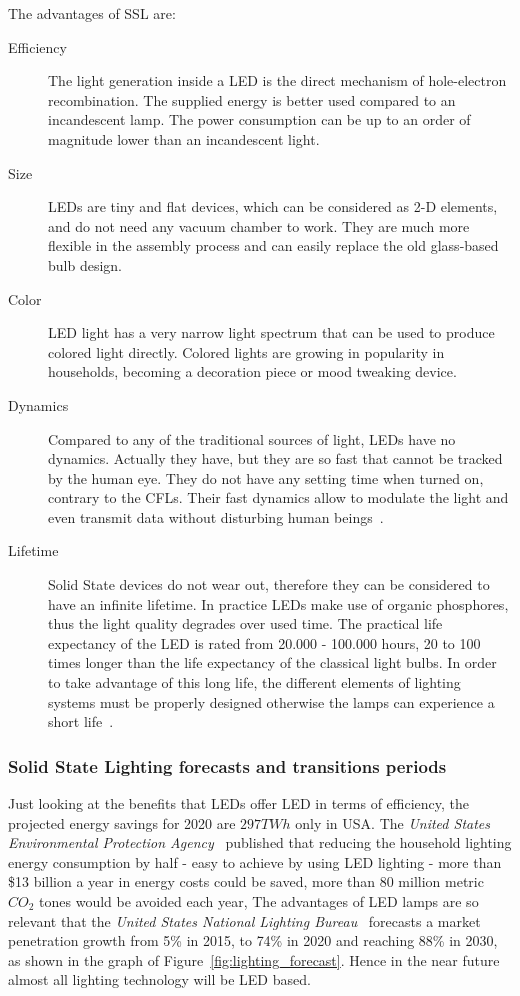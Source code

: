 The advantages of SSL are:
\begin{description}
  \item [Efficiency] The light generation inside a LED is the direct mechanism of hole-electron recombination. The supplied energy is better used compared to an incandescent lamp. The power consumption can be up to an order of magnitude lower than an incandescent light.

  \item [Size] LEDs are tiny and flat devices, which can be considered as 2-D elements,  and do not need any vacuum chamber to work. They are much more flexible in the assembly process and can easily replace the old glass-based bulb design.

  \item [Color] LED light has a very narrow light spectrum that can be used to produce colored light directly. Colored lights are growing in popularity in households, becoming a decoration piece or mood tweaking device.

  \item [Dynamics] Compared to any of the traditional sources of light, LEDs have no dynamics. Actually they have, but they are so fast that cannot be tracked by the human eye. They do not have any setting time when turned on, contrary to the CFLs. Their fast dynamics allow to modulate the light and even transmit data without disturbing human beings~\cite{2000Tanaka,2004Komine}.

  \item [Lifetime] Solid State devices do not wear out, therefore they can be considered to have an infinite lifetime. In practice LEDs make use of organic phosphores, thus the light quality degrades over used time. The practical life expectancy of the LED is rated from 20.000 - 100.000 hours, 20 to 100 times longer than the life expectancy of the classical light bulbs. In order to take advantage of this long life, the different elements of lighting systems must be properly designed otherwise the lamps can experience a short life~\cite{2005Narendran}.
\end{description}

\subsubsection{Solid State Lighting forecasts and transitions periods}
Just looking at the benefits that LEDs offer LED in terms of efficiency, the projected energy savings for 2020 are $297TWh$ only in USA. The \emph{United States Environmental Protection Agency}~\cite{14USDoE} published that reducing the household lighting energy consumption by half - easy to achieve by using LED lighting -  more than \$13 billion a year in energy costs could be saved, more than 80 million metric $CO_2$ tones would be avoided each year, %
The advantages of LED lamps are so relevant that the \emph{United States National Lighting Bureau}~\cite{14USDoE} forecasts a market penetration growth from 5\% in 2015, to 74\% in 2020 and reaching 88\% in 2030, as shown in the graph of Figure~\ref{fig:lighting_forecast}. Hence in the near future almost all lighting technology will be LED based.

